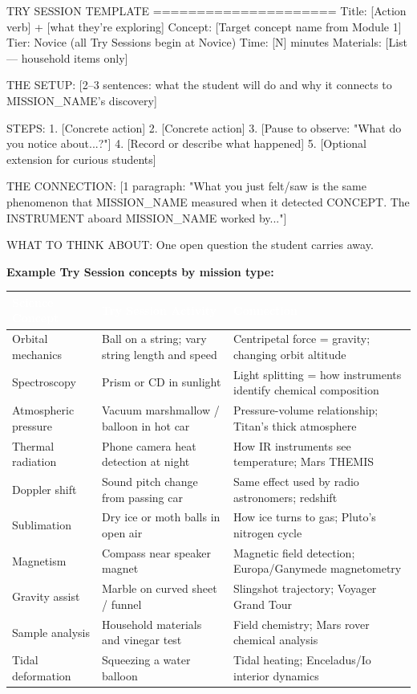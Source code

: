 \documentclass[11pt,letterpaper]{article}
\newcommand{\tableheader}[1]{\textbf{\sffamily\textcolor{white}{#1}}}
\begin{document}
\begin{asciibox}
TRY SESSION TEMPLATE
=====================
Title:      [Action verb] + [what they're exploring]
Concept:    [Target concept name from Module 1]
Tier:       Novice (all Try Sessions begin at Novice)
Time:       [N] minutes
Materials:  [List — household items only]

THE SETUP:
  [2–3 sentences: what the student will do and why it connects
   to {MISSION_NAME}'s discovery]

STEPS:
  1. [Concrete action]
  2. [Concrete action]
  3. [Pause to observe: "What do you notice about...?"]
  4. [Record or describe what happened]
  5. [Optional extension for curious students]

THE CONNECTION:
  [1 paragraph: "What you just felt/saw is the same phenomenon
   that {MISSION_NAME} measured when it detected {CONCEPT}.
   The {INSTRUMENT} aboard {MISSION_NAME} worked by..."]

WHAT TO THINK ABOUT:
  One open question the student carries away.
\end{asciibox}

\textbf{Example Try Session concepts by mission type:}

\begin{center}
\begin{tabularx}{\textwidth}{L{3cm}L{4cm}X}
\toprule
{}
\tableheader{Science Concept} & \tableheader{Try Session Activity} & \tableheader{Connection} \\
\midrule
Orbital mechanics & Ball on a string; vary string length and speed & Centripetal force = gravity; changing orbit altitude \\
Spectroscopy & Prism or CD in sunlight & Light splitting = how instruments identify chemical composition \\
Atmospheric pressure & Vacuum marshmallow / balloon in hot car & Pressure-volume relationship; Titan's thick atmosphere \\
Thermal radiation & Phone camera heat detection at night & How IR instruments see temperature; Mars THEMIS \\
Doppler shift & Sound pitch change from passing car & Same effect used by radio astronomers; redshift \\
Sublimation & Dry ice or moth balls in open air & How ice turns to gas; Pluto's nitrogen cycle \\
Magnetism & Compass near speaker magnet & Magnetic field detection; Europa/Ganymede magnetometry \\
Gravity assist & Marble on curved sheet / funnel & Slingshot trajectory; Voyager Grand Tour \\
Sample analysis & Household materials and vinegar test & Field chemistry; Mars rover chemical analysis \\
Tidal deformation & Squeezing a water balloon & Tidal heating; Enceladus/Io interior dynamics \\
\bottomrule
\end{tabularx}
\end{center}
\end{document}
